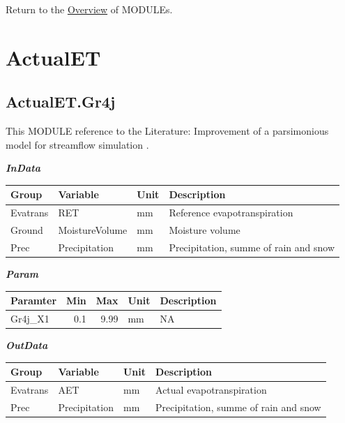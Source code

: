 \documentclass[
]{book}
\begin{document}
Return to the \protect\hyperlink{module}{Overview} of MODULEs.

\hypertarget{ActualET}{%
\section{ActualET}\label{ActualET}}

\hypertarget{ActualET.Gr4j}{%
\subsection{ActualET.Gr4j}\label{ActualET.Gr4j}}

This MODULE reference to the Literature: Improvement of a parsimonious model for streamflow simulation \citep{Perrin.2003}.

\textbf{\emph{InData}}

\begin{table}[!h]
\centering
\begin{tabular}{l|l|l|l}
\hline
Group & Variable & Unit & Description\\
\hline
Evatrans & RET & mm & Reference evapotranspiration\\
\cline{1-4}
Ground & MoistureVolume & mm & Moisture volume\\
\cline{1-4}
Prec & Precipitation & mm & Precipitation, summe of rain and snow\\
\hline
\end{tabular}
\end{table}

\textbf{\emph{Param}}

\begin{table}[!h]
\centering
\begin{tabular}{l|r|r|l|l}
\hline
Paramter & Min & Max & Unit & Description\\
\hline
Gr4j\_X1 & 0.1 & 9.99 & mm & NA\\
\hline
\end{tabular}
\end{table}

\textbf{\emph{OutData}}

\begin{table}[!h]
\centering
\begin{tabular}{l|l|l|l}
\hline
Group & Variable & Unit & Description\\
\hline
Evatrans & AET & mm & Actual evapotranspiration\\
\cline{1-4}
Prec & Precipitation & mm & Precipitation, summe of rain and snow\\
\hline
\end{tabular}
\end{table}
\end{document}
